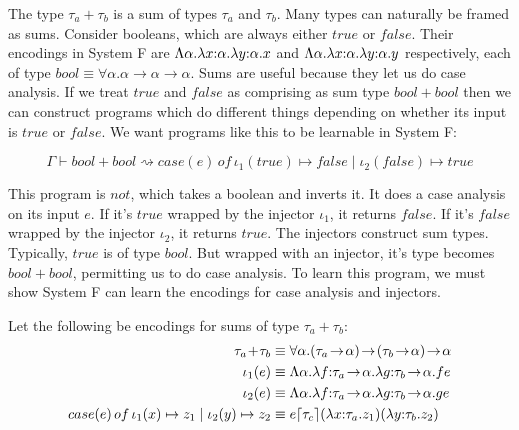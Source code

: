 The type $\tau_a\!+\!\tau_b$ is a sum of types $\tau_a$ and $\tau_b$. Many types can naturally be framed as sums. Consider booleans, which are always either $true$ or $false$. Their encodings in System F are $\Lambda\alpha.\lambda x{:}\alpha.\lambda y{:}\alpha.x$ and $\Lambda\alpha.\lambda x{:}\alpha.\lambda y{:}\alpha.y$ respectively, each of type $bool \equiv \forall\alpha.\alpha\!\to\!\alpha\!\to\!\alpha$. Sums are useful because they let us do case analysis. If we treat $true$ and $false$ as comprising as sum type $bool\!+\!bool$ then we can construct programs which do different things depending on whether its input is $true$ or $false$. We want programs like this to be learnable in System F:\vspace{-1.0em}
\begin{singlespace}
$$\Gamma \vdash bool\!+\!bool \rightsquigarrow case(e)\,of\, \iota_1(true) \mapsto false \mid \iota_2(false) \mapsto true$$
\end{singlespace}
This program is $not$, which takes a boolean and inverts it. It does a case analysis on its input $e$. If it's $true$ wrapped by the injector $\iota_1$, it returns $false$. If it's $false$ wrapped by the injector $\iota_2$, it returns $true$. The injectors construct sum types. Typically, $true$ is of type $bool$. But wrapped with an injector, it's type becomes $bool+bool$, permitting us to do case analysis. To learn this program, we must show System F can learn the encodings for case analysis and injectors.

Let the following be encodings for sums of type $\tau_a\!+\!\tau_b$:
\begin{align*}
\tau_a\!+\!\tau_b &\equiv \forall\alpha.(\tau_a\!\to\!\alpha)\!\to\!(\tau_b\!\to\!\alpha)\!\to\!\alpha\\
\iota_1(e) &\equiv \Lambda\alpha.\lam f{:}\tau_a\!\to\!\alpha.\lam g{:}\tau_b\!\to\!\alpha.fe\\
\iota_2(e) &\equiv \Lambda\alpha.\lam f{:}\tau_a\!\to\!\alpha.\lam g{:}\tau_b\!\to\!\alpha.ge\\
case(e)\,of\, \iota_1(x) \mapsto z_1 \mid \iota_2(y) \mapsto z_2 &\equiv e\lceil\tau_c\rceil(\lam x{:}\tau_a.z_1)(\lam y{:}\tau_b.z_2)
\end{align*}


